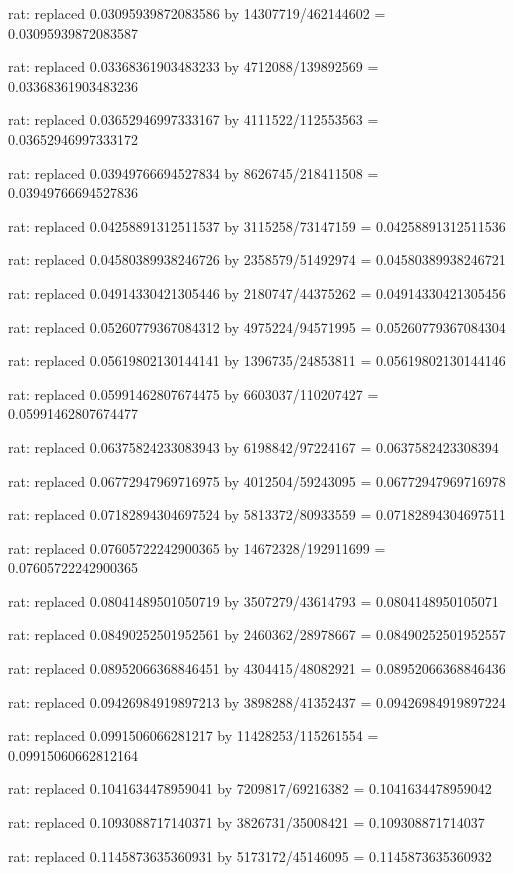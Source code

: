 \documentclass[a4paper,10pt]{article}
\begin{document}
\begin{eulernotebook}
\begin{eulercomment}
\begin{eulercomment}
\begin{eulercomment}
\begin{eulercomment}
\begin{eulercomment}
\begin{eulercomment}
\begin{eulercomment}
\begin{eulercomment}
\begin{eulercomment}
\begin{eulercomment}
\begin{eulercomment}
\begin{eulercomment}
\begin{eulercomment}
\begin{eulercomment}
\begin{eulercomment}
\begin{eulercomment}
\begin{euleroutput}
  rat: replaced 0.03095939872083586 by 14307719/462144602 = 0.03095939872083587
  
  rat: replaced 0.03368361903483233 by 4712088/139892569 = 0.03368361903483236
  
  rat: replaced 0.03652946997333167 by 4111522/112553563 = 0.03652946997333172
  
  rat: replaced 0.03949766694527834 by 8626745/218411508 = 0.03949766694527836
  
  rat: replaced 0.04258891312511537 by 3115258/73147159 = 0.04258891312511536
  
  rat: replaced 0.04580389938246726 by 2358579/51492974 = 0.04580389938246721
  
  rat: replaced 0.04914330421305446 by 2180747/44375262 = 0.04914330421305456
  
  rat: replaced 0.05260779367084312 by 4975224/94571995 = 0.05260779367084304
  
  rat: replaced 0.05619802130144141 by 1396735/24853811 = 0.05619802130144146
  
  rat: replaced 0.05991462807674475 by 6603037/110207427 = 0.05991462807674477
  
  rat: replaced 0.06375824233083943 by 6198842/97224167 = 0.0637582423308394
  
  rat: replaced 0.06772947969716975 by 4012504/59243095 = 0.06772947969716978
  
  rat: replaced 0.07182894304697524 by 5813372/80933559 = 0.07182894304697511
  
  rat: replaced 0.07605722242900365 by 14672328/192911699 = 0.07605722242900365
  
  rat: replaced 0.08041489501050719 by 3507279/43614793 = 0.0804148950105071
  
  rat: replaced 0.08490252501952561 by 2460362/28978667 = 0.08490252501952557
  
  rat: replaced 0.08952066368846451 by 4304415/48082921 = 0.08952066368846436
  
  rat: replaced 0.09426984919897213 by 3898288/41352437 = 0.09426984919897224
  
  rat: replaced 0.0991506066281217 by 11428253/115261554 = 0.09915060662812164
  
  rat: replaced 0.1041634478959041 by 7209817/69216382 = 0.1041634478959042
  
  rat: replaced 0.1093088717140371 by 3826731/35008421 = 0.109308871714037
  
  rat: replaced 0.1145873635360931 by 5173172/45146095 = 0.1145873635360932
  

\end{euleroutput}
\end{eulercomment}
\end{eulercomment}
\end{eulercomment}
\end{eulercomment}
\end{eulercomment}
\end{eulercomment}
\end{eulercomment}
\end{eulercomment}
\end{eulercomment}
\end{eulercomment}
\end{eulercomment}
\end{eulercomment}
\end{eulercomment}
\end{eulercomment}
\end{eulercomment}
\end{eulercomment}
\end{eulernotebook}
\end{document}
